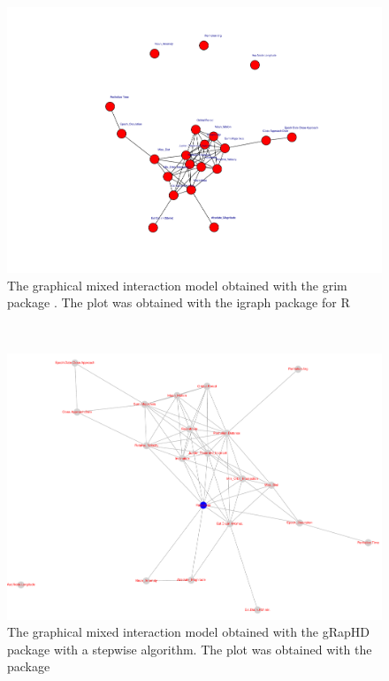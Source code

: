 \documentclass[12pt,%
               a4paper,%
               oneside,openany,%
               titlepage,%
               headinclude,footinclude,%
               BCOR5mm,%
               cleardoublepage=empty,%
               tablecaptionabove,%
               floatperchapter,
               ]{scrreprt}                 %
\begin{document}
\begin{landscape}
\begin{figure}
\begin{center}
\includegraphics[width=1.5\textheight]{Figures/mmod.pdf}
\caption{The graphical mixed interaction model obtained with the grim package \cite{hojsgaard2012graphical}. The plot was obtained with the igraph package for R \cite{igraph} }
\label{mmod}
\end{center}
\end{figure}
\end{landscape}
\\
\begin{landscape}
\begin{figure}
\begin{center}
\includegraphics[width=1.5\textheight]{Figures/minforest.pdf}
\caption{The graphical mixed interaction model obtained with the gRapHD package \cite{de2009high} with a stepwise algorithm. The plot was obtained with the \cite{qgraph} package }
\label{minforest}
\end{center}
\end{figure}
\end{landscape}
\end{document}
